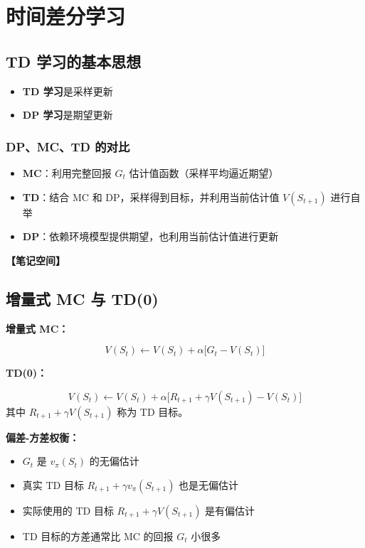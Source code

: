 \documentclass[12pt,a4paper]{article}
\newcommand{\notespace}[1][3cm]{%
  \vspace{#1}%
  \noindent\textbf{【笔记空间】}%
  \vspace{#1}%
}
\newcommand{\1}{\mathbf{1}}
\begin{document}
\section{时间差分学习}

\subsection{TD 学习的基本思想}

\begin{keybox}
\begin{itemize}[leftmargin=1.5em]
  \item \textbf{TD 学习}是采样更新
  \item \textbf{DP 学习}是期望更新
\end{itemize}
\end{keybox}

\subsubsection*{DP、MC、TD 的对比}

\begin{itemize}[leftmargin=2em]
  \item \textbf{MC}：利用完整回报 $G_t$ 估计值函数（采样平均逼近期望）
  \item \textbf{TD}：结合 MC 和 DP，采样得到目标，并利用当前估计值 $V(S_{t+1})$ 进行自举
  \item \textbf{DP}：依赖环境模型提供期望，也利用当前估计值进行更新
\end{itemize}

\notespace[2cm]

\subsection{增量式 MC 与 TD(0)}

\textbf{增量式 MC：}

\begin{equation}
V(S_t)\leftarrow V(S_t)+\alpha\bigl[G_t-V(S_t)\bigr]
\end{equation}

\textbf{TD(0)：}

\begin{equation}
V(S_t)\leftarrow V(S_t)+\alpha\bigl[R_{t+1}+\gamma V(S_{t+1})-V(S_t)\bigr]
\end{equation}
其中 $R_{t+1}+\gamma V(S_{t+1})$ 称为 TD 目标。

\begin{keybox}
\textbf{偏差-方差权衡：}
\begin{itemize}[leftmargin=1.5em]
  \item $G_t$ 是 $v_\pi(S_t)$ 的无偏估计
  \item 真实 TD 目标 $R_{t+1}+\gamma v_\pi(S_{t+1})$ 也是无偏估计
  \item 实际使用的 TD 目标 $R_{t+1}+\gamma V(S_{t+1})$ 是有偏估计
  \item TD 目标的方差通常比 MC 的回报 $G_t$ 小很多
\end{itemize}
\end{keybox}
\end{document}
